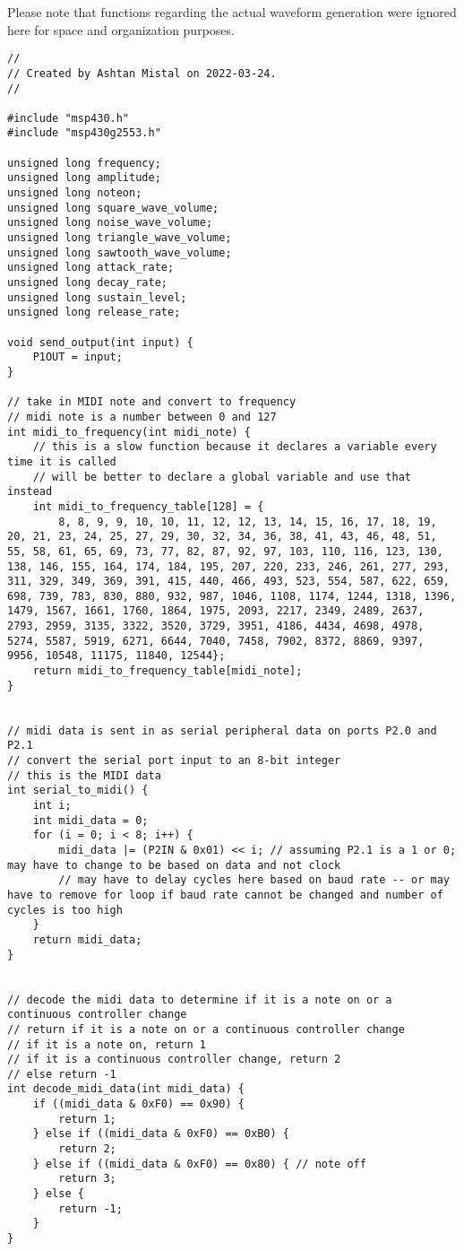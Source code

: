 Please note that functions regarding the actual waveform generation were ignored here for space and organization purposes. 

\begin{lstlisting}[label={lst:lstlisting}]
//
// Created by Ashtan Mistal on 2022-03-24.
//

#include "msp430.h"
#include "msp430g2553.h"

unsigned long frequency;
unsigned long amplitude;
unsigned long noteon;
unsigned long square_wave_volume;
unsigned long noise_wave_volume;
unsigned long triangle_wave_volume;
unsigned long sawtooth_wave_volume;
unsigned long attack_rate;
unsigned long decay_rate;
unsigned long sustain_level;
unsigned long release_rate;

void send_output(int input) {
    P1OUT = input;
}

// take in MIDI note and convert to frequency
// midi note is a number between 0 and 127
int midi_to_frequency(int midi_note) {
    // this is a slow function because it declares a variable every time it is called
    // will be better to declare a global variable and use that instead
    int midi_to_frequency_table[128] = {
        8, 8, 9, 9, 10, 10, 11, 12, 12, 13, 14, 15, 16, 17, 18, 19, 20, 21, 23, 24, 25, 27, 29, 30, 32, 34, 36, 38, 41, 43, 46, 48, 51, 55, 58, 61, 65, 69, 73, 77, 82, 87, 92, 97, 103, 110, 116, 123, 130, 138, 146, 155, 164, 174, 184, 195, 207, 220, 233, 246, 261, 277, 293, 311, 329, 349, 369, 391, 415, 440, 466, 493, 523, 554, 587, 622, 659, 698, 739, 783, 830, 880, 932, 987, 1046, 1108, 1174, 1244, 1318, 1396, 1479, 1567, 1661, 1760, 1864, 1975, 2093, 2217, 2349, 2489, 2637, 2793, 2959, 3135, 3322, 3520, 3729, 3951, 4186, 4434, 4698, 4978, 5274, 5587, 5919, 6271, 6644, 7040, 7458, 7902, 8372, 8869, 9397, 9956, 10548, 11175, 11840, 12544};
    return midi_to_frequency_table[midi_note];
}


// midi data is sent in as serial peripheral data on ports P2.0 and P2.1
// convert the serial port input to an 8-bit integer
// this is the MIDI data
int serial_to_midi() {
    int i;
    int midi_data = 0;
    for (i = 0; i < 8; i++) {
        midi_data |= (P2IN & 0x01) << i; // assuming P2.1 is a 1 or 0; may have to change to be based on data and not clock
        // may have to delay cycles here based on baud rate -- or may have to remove for loop if baud rate cannot be changed and number of cycles is too high
    }
    return midi_data;
}


// decode the midi data to determine if it is a note on or a continuous controller change
// return if it is a note on or a continuous controller change
// if it is a note on, return 1
// if it is a continuous controller change, return 2
// else return -1
int decode_midi_data(int midi_data) {
    if ((midi_data & 0xF0) == 0x90) {
        return 1;
    } else if ((midi_data & 0xF0) == 0xB0) {
        return 2;
    } else if ((midi_data & 0xF0) == 0x80) { // note off
        return 3;
    } else {
        return -1;
    }
}


\end{lstlisting}

